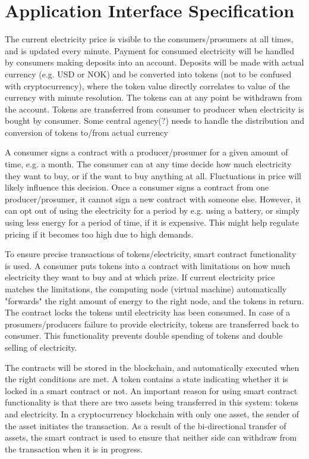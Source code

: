 \section{Application Interface Specification}
The current electricity price is visible to the consumers/prosumers at all times, and is updated every minute. Payment for consumed electricity will be handled by consumers making deposits into an account. Deposits will be made with actual currency (e.g. USD or NOK) and be converted into tokens (not to be confused with cryptocurrency), where the token value directly correlates to value of the currency with minute resolution. The tokens can at any point be withdrawn from the account. Tokens are transferred from consumer to producer when electricity is bought by consumer. Some central agency(?) needs to handle the distribution and conversion of tokens to/from actual currency

A consumer signs a contract with a producer/prosumer for a given amount of time, e.g. a month. The consumer can at any time decide how much electricity they want to buy, or if the want to buy anything at all. Fluctuations in price will likely influence this decision. Once a consumer signs a contract from one producer/prosumer, it cannot sign a new contract with someone else. However, it can opt out of using the electricity for a period by e.g. using a battery, or simply using less energy for a period of time, if it is expensive. This might help regulate pricing if it becomes too high due to high demands. 

To ensure precise transactions of tokens/electricity, smart contract functionality is used. A consumer puts tokens into a contract with limitations on how much electricity they want to buy and at which prize. If current electricity price matches the limitations, the computing node (virtual machine) automatically "forwards" the right amount of energy to the right node, and the tokens in return. The contract locks the tokens until electricity has been consumed. In case of a prosumers/producers failure to provide electricity, tokens are transferred back to consumer. This functionality prevents double spending of tokens and double selling of electricity.

The contracts will be stored in the blockchain, and automatically executed when the right conditions are met. A token contains a state indicating whether it is locked in a smart contract or not. An important reason for using smart contract functionality is that there are two assets being transferred in this system: tokens and electricity. In a cryptocurrency blockchain with only one asset, the sender of the asset initiates the transaction. As a result of the bi-directional transfer of assets, the smart contract is used to ensure that neither side can withdraw from the transaction when it is in progress. 

